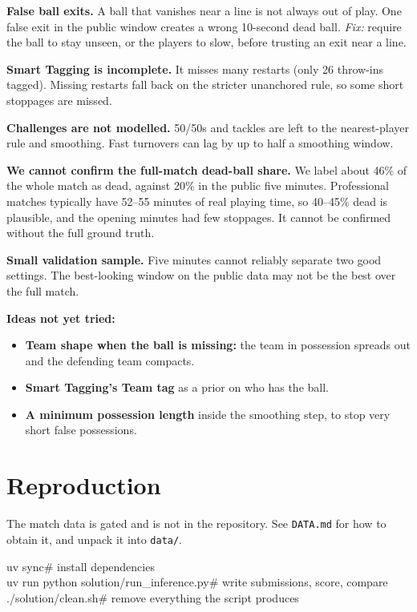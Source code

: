 \documentclass[10pt,a4paper]{article}
\newcommand{\lbl}[1]{\texttt{#1}}
\begin{document}
\textbf{False ball exits.} A ball that vanishes near a line is not always out of play. One false exit in the
public window creates a wrong 10-second dead ball. \emph{Fix:} require the ball to stay unseen, or the players to
slow, before trusting an exit near a line.

\textbf{Smart Tagging is incomplete.} It misses many restarts (only 26 throw-ins tagged). Missing restarts fall
back on the stricter unanchored rule, so some short stoppages are missed.

\textbf{Challenges are not modelled.} 50/50s and tackles are left to the nearest-player rule and smoothing.
Fast turnovers can lag by up to half a smoothing window.

\textbf{We cannot confirm the full-match dead-ball share.} We label about 46\% of the whole match as dead, against
20\% in the public five minutes. Professional matches typically have 52--55 minutes of real playing time, so
40--45\% dead is plausible, and the opening minutes had few stoppages. It cannot be confirmed without the full
ground truth.

\textbf{Small validation sample.} Five minutes cannot reliably separate two good settings. The best-looking
window on the public data may not be the best over the full match.

\textbf{Ideas not yet tried:}
\begin{itemize}
  \item \textbf{Team shape when the ball is missing:} the team in possession spreads out and the defending team compacts.
  \item \textbf{Smart Tagging's Team tag} as a prior on who has the ball.
  \item \textbf{A minimum possession length} inside the smoothing step, to stop very short false possessions.
\end{itemize}

\section{Reproduction}

The match data is gated and is not in the repository. See \lbl{DATA.md} for how to obtain it, and unpack it into
\lbl{data/}.

\begin{tcolorbox}[colback=note, colframe=rule, boxrule=0.4pt, sharp corners, left=6pt]
\small\ttfamily
uv sync\hfill\textcolor{ink2}{\# install dependencies}\\
uv run python solution/run\_inference.py\hfill\textcolor{ink2}{\# write submissions, score, compare}\\
./solution/clean.sh\hfill\textcolor{ink2}{\# remove everything the script produces}
\end{tcolorbox}
\end{document}
